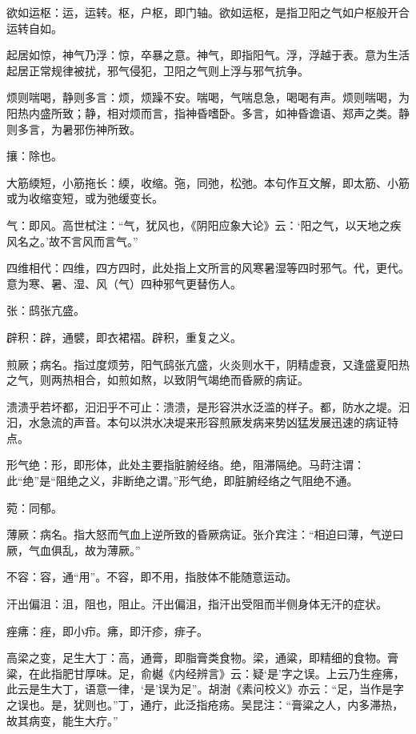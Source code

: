\documentclass[draft,12pt]{ctexbook}
\begin{document}
\begin{jiaozhu}
  \item 欲如运枢：运，运转。枢，户枢，即门轴。欲如运枢，是指卫阳之气如户枢般开合运转自如。
  \item 起居如惊，神气乃浮：惊，卒暴之意。神气，即指阳气。浮，浮越于表。意为生活起居正常规律被扰，邪气侵犯，卫阳之气则上浮与邪气抗争。
  \item 烦则喘喝，静则多言：烦，烦躁不安。喘喝，气喘息急，喝喝有声。烦则喘喝，为阳热内盛所致；静，相对烦而言，指神昏嗜卧。多言，如神昏谵语、郑声之类。静则多言，为暑邪伤神所致。
  \item 攘：除也。
  \item 大筋緛短，小筋拖长：緛，收缩。㢮，同弛，松弛。本句作互文解，即太筋、小筋或为收缩变短，或为弛缓变长。
  \item 气：即风。高世栻注：“气，犹风也，《阴阳应象大论》云：‘阳之气，以天地之疾风名之。’故不言风而言气。”
  \item 四维相代：四维，四方四时，此处指上文所言的风寒暑湿等四时邪气。代，更代。意为寒、暑、湿、风（气）四种邪气更替伤人。
  \item 张：鸱张亢盛。
  \item 辟积：辟，通襞，即衣裙褶。辟积，重复之义。
  \item 煎厥；病名。指过度烦劳，阳气鸱张亢盛，火炎则水干，阴精虚衰，又逢盛夏阳热之气，则两热相合，如煎如熬，以致阴气竭绝而昏厥的病证。
  \item 溃溃乎若坏都，汩汩乎不可止：溃溃，是形容洪水泛滥的样子。都，防水之堤。汩汩，水急流的声音。本句以洪水决堤来形容煎厥发病来势凶猛发展迅速的病证特点。
  \item 形气绝：形，即形体，此处主要指脏腑经络。绝，阻滞隔绝。马莳注谓：此“绝”是“阻绝之义，非断绝之谓。”形气绝，即脏腑经络之气阻绝不通。
  \item 菀：同郁。
  \item 薄厥：病名。指大怒而气血上逆所致的昏厥病证。张介宾注：“相迫曰薄，气逆曰厥，气血俱乱，故为薄厥。”
  \item 不容：容，通“用”。不容，即不用，指肢体不能随意运动。
  \item 汗出偏沮：沮，阻也，阻止。汗出偏沮，指汗出受阻而半侧身体无汗的症状。
  \item 痤疿：痤，即小疖。疿，即汗疹，痱子。
  \item 高梁之变，足生大丁：高，通膏，即脂膏类食物。梁，通粱，即精细的食物。膏粱，在此指肥甘厚味。足，俞樾《内经辨言》云：疑‘是’字之误。上云乃生痤疿，此云是生大丁，语意一律，‘是’误为足”。胡澍《素问校义》亦云：“足，当作是字之误也。是，犹则也。”丁，通疔，此泛指疮疡。吴昆注：“膏粱之人，内多滞热，故其病变，能生大疔。”

\end{jiaozhu}
\end{document}

